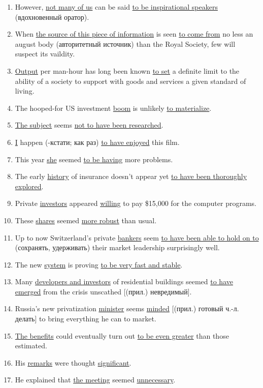\documentclass[main.tex]{subfiles}
\begin{document}
\begin{enumerate}[nosep,leftmargin=*]
	\item However, \uline{not many of us} can be said \uline{to be inspirational speakers} (вдохновенный оратор).
	\item When \uline{the source of this piece of information} is seen \uline{to come from} no less an august body (авторитетный источник) than the Royal Society, few will suspect its vaildity.
	\item \uline{Output} per man-hour has long been known \uline{to set} a definite limit to the ability of a society to support with goods and services a given standard of living.
	\item The hooped-for US investment \uline{boom} is unlikely \uline{to materialize}.
	\item \uline{The subject} seems \uline{not to have been researched}.
	\item \uline{I} happen (-кстати; как раз) \uline{to have enjoyed} this film.
	\item This year \uline{she} seemed \uline{to be having} more problems.
	\item The early \uline{history} of insurance doesn't appear yet \uline{to have been thoroughly explored}.
	\item Private \uline{investors} appeared \uline{willing} to pay \$15,000 for the computer programs.
	\item These \uline{shares} seemed \uline{more robust} than usual.
	\item Up to now Switzerland's private \uline{bankers} seem \uline{to have been able to hold on to} (сохранять, удерживать) their market leadership surprisingly well.
	\item The new \uline{system} is proving \uline{to be very fast and stable}.
	\item Many \uline{developers and investors} of residential buildings seemed \uline{to have emerged} from the crisis unscathed  [(прил.) невредимый].
	\item Russia's new privatization \uline{minister} seems \uline{minded} [(прил.) готовый ч.-л. делать] to bring everything he can to market.
	\item \uline{The benefits} could eventually turn out \uline{to be even greater} than those estimated.
	\item His \uline{remarks} were thought \uline{significant}.
	\item He explained that \uline{the meeting} seemed \uline{unnecessary}.
\end{enumerate}
\ 
\end{document}
